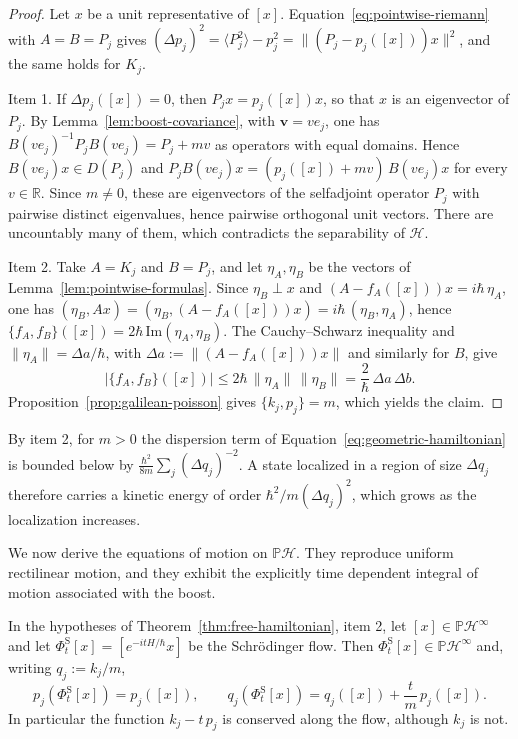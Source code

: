 \begin{proof}
	Let $x$ be a unit representative of $[x]$. Equation~\eqref{eq:pointwise-riemann} with $A=B=P_j$ gives $(\Delta p_j)^2=\langle P_j^2\rangle-p_j^2=\|(P_j-p_j([x]))x\|^2$, and the same holds for $K_j$.
	
	Item 1. If $\Delta p_j([x])=0$, then $P_jx=p_j([x])x$, so that $x$ is an eigenvector of $P_j$. By Lemma~\ref{lem:boost-covariance}, with $\mathbf{v}=ve_j$, one has $B(ve_j)^{-1}P_jB(ve_j)=P_j+mv$ as operators with equal domains. Hence $B(ve_j)x\in D(P_j)$ and $P_jB(ve_j)x=(p_j([x])+mv)\,B(ve_j)x$ for every $v\in\mathbb{R}$. Since $m\neq0$, these are eigenvectors of the selfadjoint operator $P_j$ with pairwise distinct eigenvalues, hence pairwise orthogonal unit vectors. There are uncountably many of them, which contradicts the separability of $\mathcal{H}$.
	
	Item 2. Take $A=K_j$ and $B=P_j$, and let $\eta_A,\eta_B$ be the vectors of Lemma~\ref{lem:pointwise-formulas}. Since $\eta_B\perp x$ and $(A-f_A([x]))x=i\hbar\,\eta_A$, one has $(\eta_B,Ax)=(\eta_B,(A-f_A([x]))x)=i\hbar\,(\eta_B,\eta_A)$, hence $\{f_A,f_B\}([x])=2\hbar\,\mathrm{Im}(\eta_A,\eta_B)$. The Cauchy--Schwarz inequality and $\|\eta_A\|=\Delta a/\hbar$, with $\Delta a:=\|(A-f_A([x]))x\|$ and similarly for $B$, give
	\begin{equation*}
		|\{f_A,f_B\}([x])|\le2\hbar\,\|\eta_A\|\,\|\eta_B\|=\frac{2}{\hbar}\,\Delta a\,\Delta b.
	\end{equation*}
	Proposition~\ref{prop:galilean-poisson} gives $\{k_j,p_j\}=m$, which yields the claim.
\end{proof}

\noindent By item 2, for $m>0$ the dispersion term of Equation~\eqref{eq:geometric-hamiltonian} is bounded below by $\frac{\hbar^2}{8m}\sum_j(\Delta q_j)^{-2}$. A state localized in a region of size $\Delta q_j$ therefore carries a kinetic energy of order $\hbar^2/m(\Delta q_j)^2$, which grows as the localization increases.

We now derive the equations of motion on $\mathbb{P}\mathcal{H}$. They reproduce uniform rectilinear motion, and they exhibit the explicitly time dependent integral of motion associated with the boost.

\begin{corollary}\label{cor:uniform-motion}
	In the hypotheses of Theorem~\ref{thm:free-hamiltonian}, item 2, let $[x]\in\mathbb{P}\mathcal{H}^\infty$ and let $\Phi^{\mathrm{S}}_t[x]=[e^{-itH/\hbar}x]$ be the Schrödinger flow. Then $\Phi^{\mathrm{S}}_t[x]\in\mathbb{P}\mathcal{H}^\infty$ and, writing $q_j:=k_j/m$,
	\begin{equation}
		p_j(\Phi^{\mathrm{S}}_t[x])=p_j([x]),\qquad q_j(\Phi^{\mathrm{S}}_t[x])=q_j([x])+\frac{t}{m}\,p_j([x]).
	\end{equation}
	In particular the function $k_j-t\,p_j$ is conserved along the flow, although $k_j$ is not.
\end{corollary}

